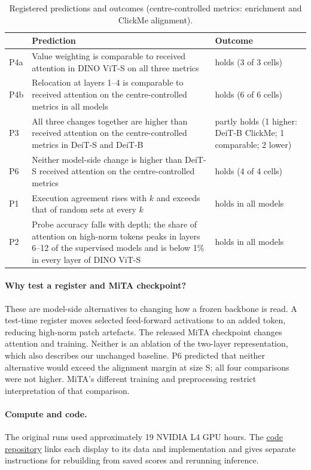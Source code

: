 \begin{table}[!htbp]
\caption{Registered predictions and outcomes (centre-controlled metrics: enrichment and ClickMe alignment).}
\label{tab:app-registered}
\centering\footnotesize
\setlength{\tabcolsep}{4pt}
\begin{tabular}{@{}l>{\raggedright\arraybackslash}p{3.55in}>{\raggedright\arraybackslash}p{1.35in}@{}}
\toprule
 & Prediction & Outcome\\
\midrule
P4a & Value weighting is comparable to received attention in DINO ViT-S on all three metrics & holds (3 of 3 cells)\\
P4b & Relocation at layers 1--4 is comparable to received attention on the centre-controlled metrics in all models & holds (6 of 6 cells)\\
P3 & All three changes together are higher than received attention on the centre-controlled metrics in DeiT-S and DeiT-B & partly holds (1 higher: DeiT-B ClickMe; 1 comparable; 2 lower)\\
P6 & Neither model-side change is higher than DeiT-S received attention on the centre-controlled metrics & holds (4 of 4 cells)\\
\midrule
P1 & Execution agreement rises with $k$ and exceeds that of random sets at every $k$ & holds in all models\\
P2 & Probe accuracy falls with depth; the share of attention on high-norm tokens peaks in layers 6--12 of the supervised models and is below 1\% in every layer of DINO ViT-S & holds in all models\\
\bottomrule
\end{tabular}
\end{table}

\paragraph{Why test a register and MiTA checkpoint?} These are model-side alternatives to changing how a frozen backbone is read. A test-time register moves selected feed-forward activations to an added token, reducing high-norm patch artefacts. The released MiTA checkpoint changes attention and training. Neither is an ablation of the two-layer representation, which also describes our unchanged baseline. P6 predicted that neither alternative would exceed the alignment margin at size S; all four comparisons were not higher. MiTA's different training and preprocessing restrict interpretation of that comparison.

\paragraph{Compute and code.} The original runs used approximately 19 NVIDIA L4 GPU hours. The \href{https://github.com/hhuang999/vit-fastweight-lens}{code repository} links each display to its data and implementation and gives separate instructions for rebuilding from saved scores and rerunning inference.

